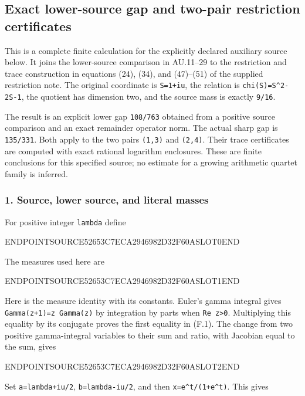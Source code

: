 \subsection{Exact lower-source gap and two-pair restriction certificates}\label{endpoint-restriction_fixture--exact-lower-source-gap-and-two-pair-restriction-certificates}

This is a complete finite calculation for the explicitly declared auxiliary source below. It joins the lower-source comparison in AU.11--29 to the restriction and trace construction in equations (24), (34), and (47)--(51) of the supplied restriction note. The original coordinate is \texttt{S=1+iu}, the relation is \texttt{chi(S)=S\^{}2-2S-1}, the quotient has dimension two, and the source mass is exactly \texttt{9/16}.

The result is an explicit lower gap \texttt{108/763} obtained from a positive source comparison and an exact remainder operator norm. The actual sharp gap is \texttt{135/331}. Both apply to the two pairs \texttt{(1,3)} and \texttt{(2,4)}. Their trace certificates are computed with exact rational logarithm enclosures. These are finite conclusions for this specified source; no estimate for a growing arithmetic quartet family is inferred.

\subsubsection{1. Source, lower source, and literal masses}\label{endpoint-restriction_fixture--source-lower-source-and-literal-masses}

For positive integer \texttt{lambda} define

ENDPOINTSOURCE52653C7ECA2946982D32F60ASLOT0END

The measures used here are

ENDPOINTSOURCE52653C7ECA2946982D32F60ASLOT1END

Here is the measure identity with its constants. Euler's gamma integral gives \texttt{Gamma(z+1)=z\ Gamma(z)} by integration by parts when \texttt{Re\ z\textgreater{}0}. Multiplying this equality by its conjugate proves the first equality in (F.1). The change from two positive gamma-integral variables to their sum and ratio, with Jacobian equal to the sum, gives

ENDPOINTSOURCE52653C7ECA2946982D32F60ASLOT2END

Set \texttt{a=lambda+iu/2}, \texttt{b=lambda-iu/2}, and then \texttt{x=e\^{}t/(1+e\^{}t)}. This gives


